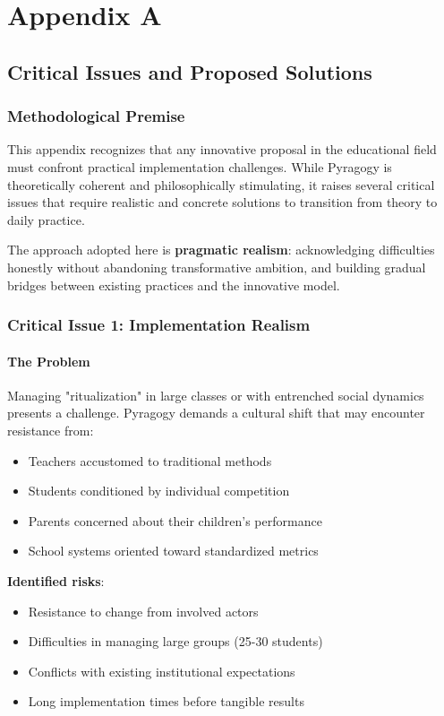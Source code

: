 \chapter{Appendix A}
\label{Appendix A}

\section{Critical Issues and Proposed Solutions}

\subsection*{Methodological Premise}
This appendix recognizes that any innovative proposal in the educational field must confront practical implementation challenges.  
While Pyragogy is theoretically coherent and philosophically stimulating, it raises several critical issues that require realistic and concrete solutions to transition from theory to daily practice.  

The approach adopted here is \textbf{pragmatic realism}: acknowledging difficulties honestly without abandoning transformative ambition, and building gradual bridges between existing practices and the innovative model.

\subsection{Critical Issue 1: Implementation Realism}

\subsubsection*{The Problem}
Managing "ritualization" in large classes or with entrenched social dynamics presents a challenge. Pyragogy demands a cultural shift that may encounter resistance from:
\begin{itemize}
	\item Teachers accustomed to traditional methods
	\item Students conditioned by individual competition
	\item Parents concerned about their children's performance
	\item School systems oriented toward standardized metrics
\end{itemize}

\textbf{Identified risks}:
\begin{itemize}
	\item Resistance to change from involved actors
	\item Difficulties in managing large groups (25-30 students)
	\item Conflicts with existing institutional expectations
	\item Long implementation times before tangible results
\end{itemize}

